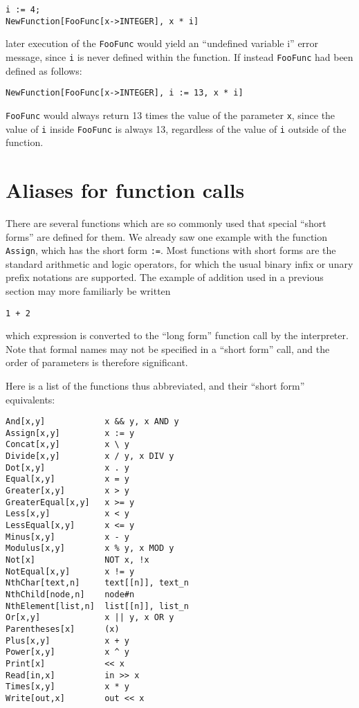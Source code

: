 \begin{verbatim}
i := 4;
NewFunction[FooFunc[x->INTEGER], x * i]
\end{verbatim}

\noindent later execution of the \verb+FooFunc+ would yield an
``undefined variable i'' error message, since \verb+i+ is never
defined within the function.  If instead \verb+FooFunc+ had been
defined as follows:

\begin{verbatim}
NewFunction[FooFunc[x->INTEGER], i := 13, x * i]
\end{verbatim}

\noindent \verb+FooFunc+ would always return 13 times the value of the
parameter \verb+x+, since the value of \verb+i+ inside \verb+FooFunc+
is always 13, regardless of the value of \verb+i+ outside of the
function.

\section{Aliases for function calls}

There are several functions which are so commonly used that special
``short forms'' are defined for them.  We already saw one example with
the function \verb+Assign+, which has the short form \verb+:=+.  Most
functions with short forms are the standard arithmetic and logic
operators, for which the usual binary infix or unary prefix notations
are supported.  The example of addition used in a previous section may
more familiarly be written

\begin{verbatim}
1 + 2
\end{verbatim}

\noindent which expression is converted to the ``long form'' function
call by the interpreter.  Note that formal names may not be specified
in a ``short form'' call, and the order of parameters is therefore
significant.

Here is a list of the functions thus abbreviated, and their ``short
form'' equivalents:

\medskip
\begin{multicols}{2}
\begin{verbatim}
And[x,y]            x && y, x AND y 
Assign[x,y]         x := y 
Concat[x,y]         x \ y 
Divide[x,y]         x / y, x DIV y 
Dot[x,y]            x . y 
Equal[x,y]          x = y 
Greater[x,y]        x > y 
GreaterEqual[x,y]   x >= y 
Less[x,y]           x < y 
LessEqual[x,y]      x <= y 
Minus[x,y]          x - y 
Modulus[x,y]        x % y, x MOD y 
Not[x]              NOT x, !x 
NotEqual[x,y]       x != y 
NthChar[text,n]     text[[n]], text_n 
NthChild[node,n]    node#n  
NthElement[list,n]  list[[n]], list_n
Or[x,y]             x || y, x OR y 
Parentheses[x]      (x) 
Plus[x,y]           x + y 
Power[x,y]          x ^ y 
Print[x]            << x
Read[in,x]          in >> x 
Times[x,y]          x * y 
Write[out,x]        out << x 
\end{verbatim}
\end{multicols}

